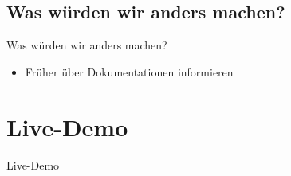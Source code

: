 \documentclass[18pt]{beamer}
\begin{document}
\subsection{Was würden wir anders machen?}
\begin{frame}{Was würden wir anders machen?}
 \begin{itemize}
  \item Früher über Dokumentationen informieren
 \end{itemize}

\end{frame}


\section{Live-Demo}
\begin{frame}
 \begin{center}
  \Huge Live-Demo
 \end{center}
\end{frame}
\end{document}
